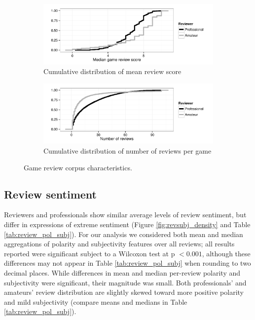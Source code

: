\documentclass[letterpaper]{article}
\begin{document}
\begin{figure}[tb]
\centering


\begin{subfigure}[b]{\linewidth}
\includegraphics[width=\linewidth]{./console_games_scoremedian_ecdf}
\caption{Cumulative distribution of mean review score}
\label{fig:game_score}
\end{subfigure}
\begin{subfigure}[b]{\linewidth}
\includegraphics[width=\linewidth]{./console_games_numreviews_ecdf}
\caption{Cumulative distribution of number of reviews per game}
\label{fig:game_reviewnum}
\end{subfigure}
\caption{Game review corpus characteristics.}
\label{fig:revscore_console}
\end{figure}

\subsection{Review sentiment}
Reviewers and professionals show similar average levels of review sentiment, but differ in expressions of extreme sentiment (Figure \ref{fig:revsubj_density} and Table \ref{tab:review_pol_subj}).
For our analysis we considered both mean and median aggregations of
polarity and subjectivity features over all reviews; all results
reported were significant subject to a Wilcoxon test at p $< 0.001$, although these differences may not appear in Table \ref{tab:review_pol_subj} when rounding to two decimal places. While differences in mean and median per-review polarity and subjectivity were significant, their magnitude was small.
Both professionals' and amateurs' review distribution are slightly skewed toward more positive polarity and mild subjectivity (compare means and medians in Table \ref{tab:review_pol_subj}). 
\end{document}
